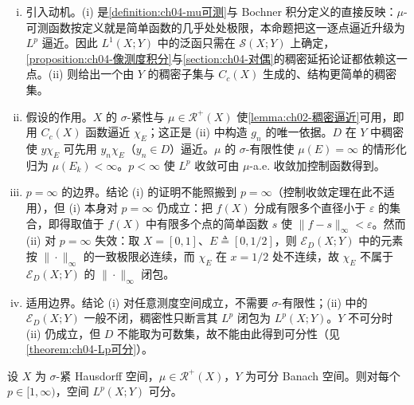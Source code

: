 \documentclass[../../main.tex]{subfiles}%
\begin{document}
\begin{remark}
\begin{enumerate}[(i)]
\item 引入动机。(i) 是\cref{definition:ch04-mu可测}与 Bochner 积分定义的直接反映：$\mu$-可测函数按定义就是简单函数的几乎处处极限，本命题把这一逐点逼近升级为 $L^p$ 逼近。因此 $L^1(X;Y)$ 中的泛函只需在 $\mathcal{S}(X;Y)$ 上确定，\cref{proposition:ch04-像测度积分}与\cref{section:ch04-对偶}的稠密延拓论证都依赖这一点。(ii) 则给出一个由 $Y$ 的稠密子集与 $C_c(X)$ 生成的、结构更简单的稠密集。

\item 假设的作用。$X$ 的 $\sigma$-紧性与 $\mu\in\mathscr{R}^+(X)$ 使\cref{lemma:ch02-稠密逼近}可用，即用 $C_c(X)$ 函数逼近 $\chi_E$；这正是 (ii) 中构造 $g_n$ 的唯一依据。$D$ 在 $Y$ 中稠密使 $y\chi_E$ 可先用 $y_n\chi_E$（$y_n\in D$）逼近。$\mu$ 的 $\sigma$-有限性使 $\mu(E)=\infty$ 的情形化归为 $\mu(E_k)<\infty$。$p<\infty$ 使 $L^p$ 收敛可由 $\mu$-a.e. 收敛加控制函数得到。

\item $p=\infty$ 的边界。结论 (i) 的证明不能照搬到 $p=\infty$（控制收敛定理在此不适用），但 (i) 本身对 $p=\infty$ 仍成立：把 $f(X)$ 分成有限多个直径小于 $\varepsilon$ 的集合，即得取值于 $f(X)$ 中有限多个点的简单函数 $s$ 使 $\|f-s\|_\infty<\varepsilon$。然而 (ii) 对 $p=\infty$ 失效：取 $X=[0,1]$、$E\triangleq[0,1/2]$，则 $\mathcal{E}_D(X;Y)$ 中的元素按 $\|\cdot\|_\infty$ 的一致极限必连续，而 $\chi_E$ 在 $x=1/2$ 处不连续，故 $\chi_E$ 不属于 $\mathcal{E}_D(X;Y)$ 的 $\|\cdot\|_\infty$ 闭包。

\item 适用边界。结论 (i) 对任意测度空间成立，不需要 $\sigma$-有限性；(ii) 中的 $\mathcal{E}_D(X;Y)$ 一般不闭，稠密性只断言其 $L^p$ 闭包为 $L^p(X;Y)$。$Y$ 不可分时 (ii) 仍成立，但 $D$ 不能取为可数集，故不能由此得到可分性（见\cref{theorem:ch04-Lp可分}）。
\end{enumerate}
\end{remark}

\begin{theorem}\label{theorem:ch04-Lp可分}
\label{theorem:ch04-可分}
设 $X$ 为 $\sigma$-紧 Hausdorff 空间，$\mu\in\mathscr{R}^+(X)$，$Y$ 为可分 Banach 空间。则对每个 $p\in[1,\infty)$，空间 $L^p(X;Y)$ 可分。
\end{theorem}
\end{document}
